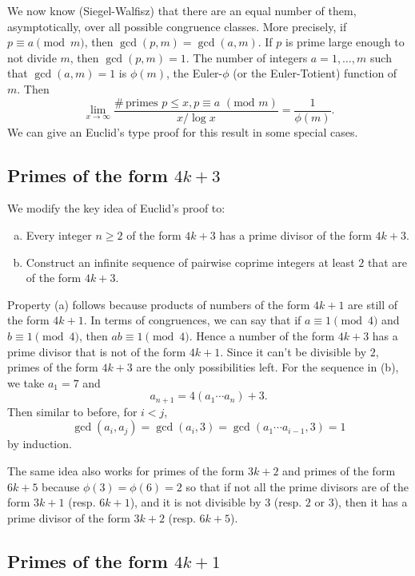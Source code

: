 \documentclass{article}
\begin{document}
We now know (Siegel-Walfisz) that there are an equal number of them, asymptotically, over all possible congruence classes. More precisely, if $p\equiv a\pmod{m}$, then $\gcd(p,m) = \gcd(a,m)$. If $p$ is prime large enough to not divide $m$, then $\gcd(p,m) = 1$. The number of integers $a = 1,\ldots,m$ such that $\gcd(a,m)=1$ is $\phi(m)$, the Euler-$\phi$ (or the Euler-Totient) function of $m$. Then 
$$\lim_{x\rightarrow\infty}\frac{\#\,\text{primes }p\leq x,p\equiv a \,\,(\text{mod }m)}{x/\log x} = \frac{1}{\phi(m)}.$$
We can give an Euclid's type proof for this result in some special cases.

\subsection*{Primes of the form $4k+3$} 

We modify the key idea of Euclid's proof to:
\begin{enumerate}[(a)]
    \item Every integer $n\geq2$ of the form $4k+3$ has a prime divisor of the form $4k+3$.
    \item Construct an infinite sequence of pairwise coprime integers at least $2$ that are of the form $4k+3$.
\end{enumerate}
Property (a) follows because products of numbers of the form $4k+1$ are still of the form $4k+1$. In terms of congruences, we can say that if $a\equiv 1\pmod{4}$ and $b\equiv 1\pmod{4}$, then $ab\equiv 1\pmod{4}$. Hence a number of the form $4k+3$ has a prime divisor that is not of the form $4k+1$. Since it can't be divisible by $2$, primes of the form $4k+3$ are the only possibilities left. For the sequence in (b), we take $a_1 = 7$ and $$a_{n+1} = 4(a_1\cdots a_n) + 3.$$
Then similar to before, for $i<j$, $$\gcd(a_i,a_j) = \gcd(a_i,3) = \gcd(a_1\cdots a_{i-1},3) = 1$$
by induction.

\vspace{5pt}
The same idea also works for primes of the form $3k+2$ and primes of the form $6k+5$ because $\phi(3) = \phi(6) = 2$ so that if not all the prime divisors are of the form $3k+1$ (resp. $6k+1$), and it is not divisible by $3$ (resp. $2$ or $3$), then it has a prime divisor of the form $3k+2$ (resp. $6k+5$).

\subsection*{Primes of the form $4k+1$}
\end{document}

